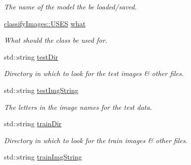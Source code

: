 \begin{DoxyCompactItemize}
\begin{DoxyCompactList}\small\item\em The name of the model the be loaded/saved. \item\end{DoxyCompactList}\item 
\hypertarget{classclassifyImages_a9e23cf1c143525bef9b6b2422417cea9}{
\hyperlink{classclassifyImages_a7fab19a2fed8c0c376fdb8f7c16abb6b}{classifyImages::USES} \hyperlink{classclassifyImages_a9e23cf1c143525bef9b6b2422417cea9}{what}}
\label{classclassifyImages_a9e23cf1c143525bef9b6b2422417cea9}

\begin{DoxyCompactList}\small\item\em What should the class be used for. \item\end{DoxyCompactList}\item 
\hypertarget{classclassifyImages_a3fb484b2bbea1ba4fd18d6d9473fd133}{
std::string \hyperlink{classclassifyImages_a3fb484b2bbea1ba4fd18d6d9473fd133}{testDir}}
\label{classclassifyImages_a3fb484b2bbea1ba4fd18d6d9473fd133}

\begin{DoxyCompactList}\small\item\em Directory in which to look for the test images \& other files. \item\end{DoxyCompactList}\item 
\hypertarget{classclassifyImages_a01c33fc39dc8933a8ef92c6e58fc3ebc}{
std::string \hyperlink{classclassifyImages_a01c33fc39dc8933a8ef92c6e58fc3ebc}{testImgString}}
\label{classclassifyImages_a01c33fc39dc8933a8ef92c6e58fc3ebc}

\begin{DoxyCompactList}\small\item\em The letters in the image names for the test data. \item\end{DoxyCompactList}\item 
\hypertarget{classclassifyImages_a0d75c20b8a5563520ebbe3ca3726bbc3}{
std::string \hyperlink{classclassifyImages_a0d75c20b8a5563520ebbe3ca3726bbc3}{trainDir}}
\label{classclassifyImages_a0d75c20b8a5563520ebbe3ca3726bbc3}

\begin{DoxyCompactList}\small\item\em Directory in which to look for the train images \& other files. \item\end{DoxyCompactList}\item 
\hypertarget{classclassifyImages_aad03618ffce6a569626a45a7d23218d8}{
std::string \hyperlink{classclassifyImages_aad03618ffce6a569626a45a7d23218d8}{trainImgString}}
\label{classclassifyImages_aad03618ffce6a569626a45a7d23218d8}


\end{DoxyCompactItemize}
